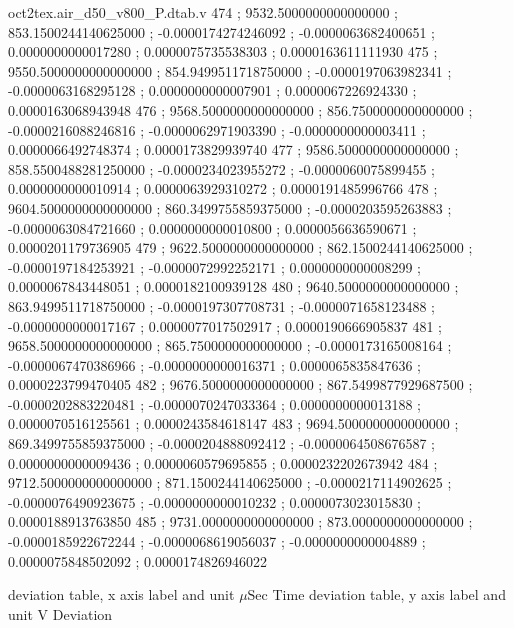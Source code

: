 \begin{filecontents}[overwrite]{oct2tex.air_d50_v800_P.dtab.v}
474 ; 9532.5000000000000000 ; 853.1500244140625000 ; -0.0000174274246092 ; -0.0000063682400651 ; 0.0000000000017280 ; 0.0000075735538303 ; 0.0000163611111930
475 ; 9550.5000000000000000 ; 854.9499511718750000 ; -0.0000197063982341 ; -0.0000063168295128 ; 0.0000000000007901 ; 0.0000067226924330 ; 0.0000163068943948
476 ; 9568.5000000000000000 ; 856.7500000000000000 ; -0.0000216088246816 ; -0.0000062971903390 ; -0.0000000000003411 ; 0.0000066492748374 ; 0.0000173829939740
477 ; 9586.5000000000000000 ; 858.5500488281250000 ; -0.0000234023955272 ; -0.0000060075899455 ; 0.0000000000010914 ; 0.0000063929310272 ; 0.0000191485996766
478 ; 9604.5000000000000000 ; 860.3499755859375000 ; -0.0000203595263883 ; -0.0000063084721660 ; 0.0000000000010800 ; 0.0000056636590671 ; 0.0000201179736905
479 ; 9622.5000000000000000 ; 862.1500244140625000 ; -0.0000197184253921 ; -0.0000072992252171 ; 0.0000000000008299 ; 0.0000067843448051 ; 0.0000182100939128
480 ; 9640.5000000000000000 ; 863.9499511718750000 ; -0.0000197307708731 ; -0.0000071658123488 ; -0.0000000000017167 ; 0.0000077017502917 ; 0.0000190666905837
481 ; 9658.5000000000000000 ; 865.7500000000000000 ; -0.0000173165008164 ; -0.0000067470386966 ; -0.0000000000016371 ; 0.0000065835847636 ; 0.0000223799470405
482 ; 9676.5000000000000000 ; 867.5499877929687500 ; -0.0000202883220481 ; -0.0000070247033364 ; 0.0000000000013188 ; 0.0000070516125561 ; 0.0000243584618147
483 ; 9694.5000000000000000 ; 869.3499755859375000 ; -0.0000204888092412 ; -0.0000064508676587 ; 0.0000000000009436 ; 0.0000060579695855 ; 0.0000232202673942
484 ; 9712.5000000000000000 ; 871.1500244140625000 ; -0.0000217114902625 ; -0.0000076490923675 ; -0.0000000000010232 ; 0.0000073023015830 ; 0.0000188913763850
485 ; 9731.0000000000000000 ; 873.0000000000000000 ; -0.0000185922672244 ; -0.0000068619056037 ; -0.0000000000004889 ; 0.0000075848502092 ; 0.0000174826946022
\end{filecontents}
\expandafter\def\csname oct2tex.air_d50_v800_P.dtabxlbl.d\endcsname{deviation table, x axis label and unit}
\expandafter\def\csname oct2tex.air_d50_v800_P.dtabxlbl.u\endcsname{\ensuremath{\mu\text{Sec}}}
\expandafter\def\csname oct2tex.air_d50_v800_P.dtabxlbl.v\endcsname{Time}
\expandafter\def\csname oct2tex.air_d50_v800_P.dtabylbl.d\endcsname{deviation table, y axis label and unit}
\expandafter\def\csname oct2tex.air_d50_v800_P.dtabylbl.u\endcsname{\ensuremath{\text{V}}}
\expandafter\def\csname oct2tex.air_d50_v800_P.dtabylbl.v\endcsname{Deviation}
